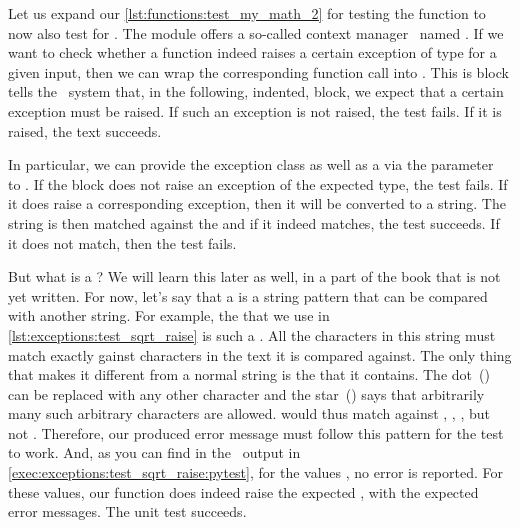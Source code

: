 Let us expand our \cref{lst:functions:test_my_math_2} for testing the  function to now also test for .
The  module offers a so-called context manager~\cite{PSF2024CUFWSC} named .
If we want to check whether a function indeed raises a certain exception of type  for a given input, then we can wrap the corresponding function call into .
This is block tells the \pytest\ system that, in the following, indented, block, we expect that a certain exception must be raised.
If such an exception is not raised, the test fails.
If it is raised, the text succeeds.

%
%
%
%
In particular, we can provide the exception class as well as a  via the parameter~ to .
If the block does not raise an exception of the expected type, the test fails.
If it does raise a corresponding exception, then it will be converted to a string.
The string is then matched against the  and if it indeed matches, the test succeeds.
If it does not match, then the test fails.%
%
\begin{sloppypar}%
But what is a ?
We will learn this later as well, in a part of the book that is not yet written.
For now, let's say that a  is a string pattern that can be compared with another string.
For example, the  that we use in \cref{lst:exceptions:test_sqrt_raise} is such a .
All the  characters in this string must match exactly gainst characters in the text it is compared against.
The only thing that makes it different from a normal string is the  that it contains.
The dot~() can be replaced with any other character and the star~(\textil{*}) says that arbitrarily many such arbitrary characters are allowed.
 would thus match against , , , but not .
Therefore, our produced error message must follow this pattern for the test to work.
And, as you can find in the \pytest\ output in \cref{exec:exceptions:test_sqrt_raise:pytest}, for the values , no error is reported.
For these values, our  function does indeed raise the expected , with the expected error messages.
The unit test succeeds.%
\end{sloppypar}%
